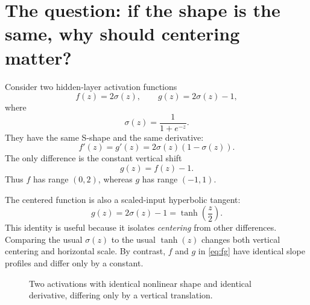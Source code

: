 \documentclass[11pt]{article}
\begin{document}
\tableofcontents
\newpage

\section{The question: if the shape is the same, why should centering matter?}

Consider two hidden-layer activation functions
\begin{equation}
  f(z)=2\sigma(z),
  \qquad
  g(z)=2\sigma(z)-1,
  \label{eq:fg}
\end{equation}
where
\[
  \sigma(z)=\frac{1}{1+e^{-z}}.
\]
They have the same S-shape and the same derivative:
\begin{equation}
  f'(z)=g'(z)=2\sigma(z)(1-\sigma(z)).
\end{equation}
The only difference is the constant vertical shift
\begin{equation}
  g(z)=f(z)-1.
  \label{eq:shift}
\end{equation}
Thus \(f\) has range \((0,2)\), whereas \(g\) has range \((-1,1)\).

The centered function is also a scaled-input hyperbolic tangent:
\begin{equation}
  g(z)=2\sigma(z)-1=\tanh\left(\frac{z}{2}\right).
  \label{eq:tanh-sigmoid}
\end{equation}
This identity is useful because it isolates \emph{centering} from other differences.  Comparing the usual \(\sigma(z)\) to the usual \(\tanh(z)\) changes both vertical centering and horizontal scale.  By contrast, \(f\) and \(g\) in \cref{eq:fg} have identical slope profiles and differ only by a constant.

\begin{figure}[htbp]
\centering
{}
\caption{Two activations with identical nonlinear shape and identical derivative, differing only by a vertical translation.}
\label{fig:activations}
\end{figure}
\end{document}
